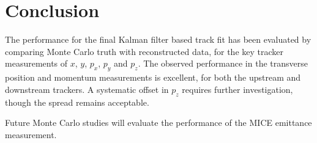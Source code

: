 \section{Conclusion}
\label{sec:Conclusion}

The performance for the final Kalman filter based track fit has been evaluated by comparing Monte Carlo truth with reconstructed data, for the key tracker measurements of $x$, $y$, $p_x$, $p_y$ and $p_z$.  The observed performance in the transverse position and momentum measurements is excellent, for both the upstream and downstream trackers. A systematic offset in $p_z$ requires further investigation, though the spread remains acceptable.

Future Monte Carlo studies will evaluate the performance of the MICE emittance measurement.
